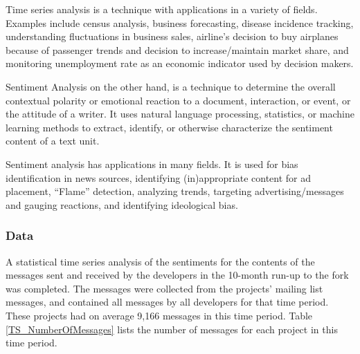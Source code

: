 \documentclass[12pt,letterpaper]{gthesis2}  %
\begin{document}
Time series analysis is a technique with applications in a variety of fields. Examples include census analysis, business forecasting, disease incidence tracking, understanding fluctuations in business sales, airline's decision to buy airplanes because of passenger trends and
decision to increase/maintain market share, and monitoring unemployment rate as an economic indicator used by decision makers.

Sentiment Analysis on the other hand, is a technique to determine the overall contextual polarity or emotional reaction to a document, interaction, or event, or the attitude of a writer. It uses natural language processing, statistics, or machine learning methods to extract, identify, or otherwise characterize the sentiment content of a text unit. 

Sentiment analysis has applications in many fields. It is used for bias identification in news sources, identifying (in)appropriate content for ad placement, ``Flame'' detection, analyzing trends, targeting advertising/messages and gauging reactions, and identifying ideological bias.

\subsubsection{Data}
A statistical time series analysis of the sentiments for the contents of the messages sent and received by the developers in the 10-month run-up to the fork was completed. The messages were collected from the projects' mailing list messages, and contained all messages by all developers for that time period. These projects had on average 9,166 messages in this time period. Table \ref{TS_NumberOfMessages} lists the number of messages for each project in this time period.
\end{document}
